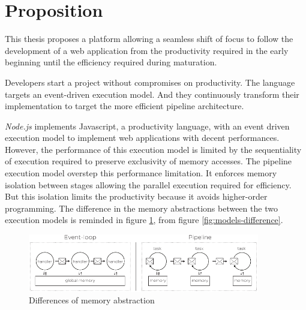 \section{Proposition} \label{chapter4:proposition}

This thesis proposes a platform allowing a seamless shift of focus to follow the development of a web application from the productivity required in the early beginning until the efficiency required during maturation.

Developers start a project without compromises on productivity.
The language targets an event-driven execution model.
And they continuously transform their implementation to target the more efficient pipeline architecture.



\textit{Node.js} implements Javascript, a productivity language, with an event driven execution model to implement web applications with decent performances.
However, the performance of this execution model is limited by the sequentiality of execution required to preserve exclusivity of memory accesses.
The pipeline execution model overstep this performance limitation.
It enforces memory isolation between stages allowing the parallel execution required for efficiency.
But this isolation limits the productivity because it avoids higher-order programming.
The difference in the memory abstractions between the two execution models is reminded in figure \ref{fig:difference}, from figure \ref{fig:models-difference}.

\begin{figure}[h!]
\begin{center}
\includegraphics[width=0.9\textwidth]{../resources/models-difference.pdf}
\end{center}
\caption{Differences of memory abstraction}
\label{fig:difference}
\end{figure}


